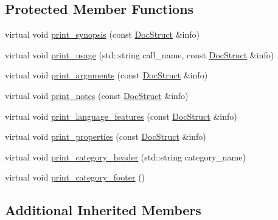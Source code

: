 \subsection*{Protected Member Functions}
\begin{DoxyCompactItemize}
\item 
virtual void \hyperlink{classPlainPrinter_ac998df8a56c056800eda2c1d9ca3f628}{print\-\_\-synopsis} (const \hyperlink{structDocStruct}{Doc\-Struct} \&info)
\item 
virtual void \hyperlink{classPlainPrinter_ab5478f9542ccf99138668975ab3192d8}{print\-\_\-usage} (std\-::string call\-\_\-name, const \hyperlink{structDocStruct}{Doc\-Struct} \&info)
\item 
virtual void \hyperlink{classPlainPrinter_a6eb1b927ed5dd5f3604041872110e51a}{print\-\_\-arguments} (const \hyperlink{structDocStruct}{Doc\-Struct} \&info)
\item 
virtual void \hyperlink{classPlainPrinter_a105fabd1f37aa1d99e4272e3ebb4d3b8}{print\-\_\-notes} (const \hyperlink{structDocStruct}{Doc\-Struct} \&info)
\item 
virtual void \hyperlink{classPlainPrinter_aa20ff6c29f9cffad1522892485316775}{print\-\_\-language\-\_\-features} (const \hyperlink{structDocStruct}{Doc\-Struct} \&info)
\item 
virtual void \hyperlink{classPlainPrinter_a0768f7e6781dfaebf0e54535f1031467}{print\-\_\-properties} (const \hyperlink{structDocStruct}{Doc\-Struct} \&info)
\item 
virtual void \hyperlink{classPlainPrinter_a860ced811a6309d1889ab926ebdd4f67}{print\-\_\-category\-\_\-header} (std\-::string category\-\_\-name)
\item 
virtual void \hyperlink{classPlainPrinter_a324d849386ce24478f5711b2fc3b26c2}{print\-\_\-category\-\_\-footer} ()
\end{DoxyCompactItemize}
\subsection*{Additional Inherited Members}


